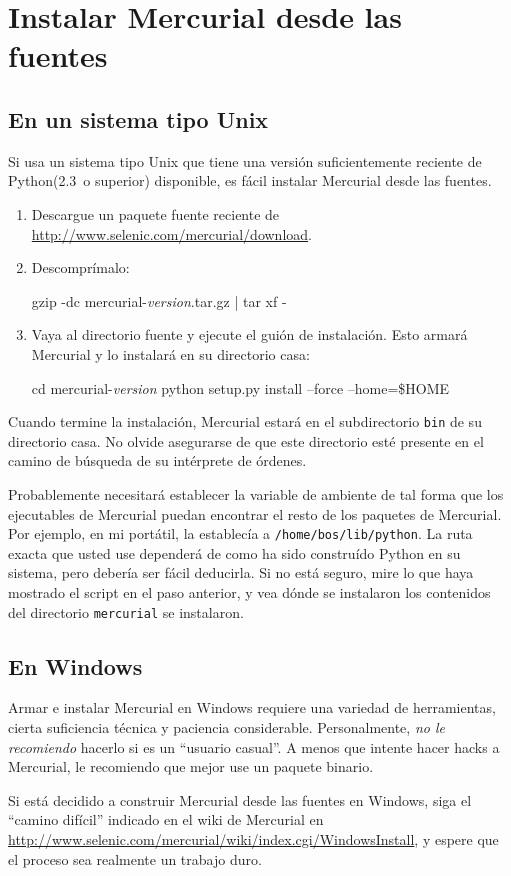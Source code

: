 \chapter{Instalar Mercurial desde las fuentes}
\label{chap:srcinstall}

\section{En un sistema tipo Unix}
\label{sec:srcinstall:unixlike}

Si usa un sistema tipo Unix que tiene una versión suficientemente
reciente de Python(2.3~o superior) disponible, es fácil instalar
Mercurial desde las fuentes.
\begin{enumerate}
\item Descargue un paquete fuente reciente de
  \url{http://www.selenic.com/mercurial/download}.
\item Descomprímalo:
  \begin{codesample4}
    gzip -dc mercurial-\emph{version}.tar.gz | tar xf -
  \end{codesample4}
\item Vaya al directorio fuente y ejecute el guión de instalación.
  Esto armará Mercurial y lo instalará en su directorio casa:
  \begin{codesample4}
    cd mercurial-\emph{version}
    python setup.py install --force --home=\$HOME
  \end{codesample4}
\end{enumerate}
Cuando termine la instalación, Mercurial estará en el subdirectorio
\texttt{bin} de su directorio casa.  No olvide asegurarse de que este
directorio esté presente en el camino de búsqueda de su intérprete de
órdenes.

Probablemente necesitará establecer la variable de ambiente
 de tal forma que los ejecutables de Mercurial
puedan encontrar el resto de los paquetes de Mercurial.  Por ejemplo,
en mi portátil, la establecía a \texttt{/home/bos/lib/python}.  La
ruta exacta que usted use dependerá de como ha sido construído Python
en su sistema, pero debería ser fácil deducirla.  Si no está seguro,
mire lo que haya mostrado el script en el paso anterior, y vea dónde
se instalaron los contenidos del directorio \texttt{mercurial} se
instalaron.

\section{En Windows}

Armar e instalar Mercurial en Windows requiere una variedad de
herramientas, cierta suficiencia técnica y paciencia considerable.
Personalmente, \emph{no le recomiendo} hacerlo si es un ``usuario
casual''.  A menos que intente hacer hacks a Mercurial, le recomiendo
que mejor use un paquete binario.

Si está decidido a construir Mercurial desde las fuentes en Windows,
siga el ``camino difícil'' indicado en el wiki de Mercurial en
\url{http://www.selenic.com/mercurial/wiki/index.cgi/WindowsInstall},
y espere que el proceso sea realmente un trabajo duro.

